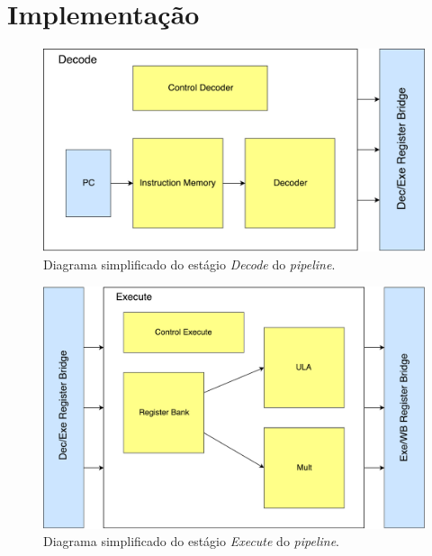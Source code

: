 \documentclass[11pt,a4paper,titlepage]{article}
\begin{document}
\section{Implementação}

\begin{figure}[!h]
\centering
\includegraphics[scale=0.4]{images/decodepipe.pdf}
\caption{Diagrama simplificado do estágio \textit{Decode} do \textit{pipeline}.}
\label{fig:decodepipe}
\end{figure}

\begin{figure}[!h]
\centering
\includegraphics[scale=0.4]{images/executepipe.pdf}
\caption{Diagrama simplificado do estágio \textit{Execute} do \textit{pipeline}.}
\label{fig:executepipe}
\end{figure}
\end{document}
